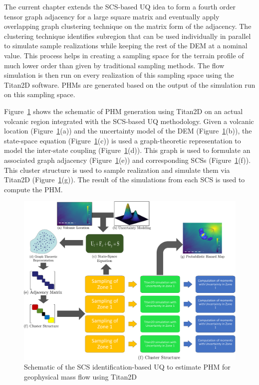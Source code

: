 

The current chapter extends the SCS-based UQ idea to form a fourth order tensor graph adjacency for a large square matrix and eventually apply overlapping graph clustering technique on the matrix form of the adjacency. The clustering technique identifies subregion that can be used individually in parallel to simulate sample realizations while keeping the rest of the DEM at a nominal value. This process helps in creating a sampling space for the terrain profile of much lower order than given by traditional sampling methods. The flow simulation is then run on every realization of this sampling space using the Titan2D software. PHMs are generated based on the output of the simulation run on this sampling space. 

Figure~\ref{fig:scs_titan} shows the schematic of PHM generation using Titan2D on an actual volcanic region integrated with the SCS-based UQ methodology. Given a volcanic location (Figure~\ref{fig:scs_titan}(a)) and the uncertainty model of the DEM (Figure~\ref{fig:scs_titan}(b)), the state-space equation (Figure~\ref{fig:scs_titan}(c)) is used a graph-theoretic representation to model the inter-state coupling (Figure~\ref{fig:scs_titan}(d)). This graph is used to formulate an associated graph adjacency (Figure~\ref{fig:scs_titan}(e)) and corresponding SCSs (Figure~\ref{fig:scs_titan}(f)). This cluster structure is used to sample realization and simulate them via Titan2D (Figure~\ref{fig:scs_titan}(g)). The result of the simulations from each SCS is used to compute the PHM. 

\begin{figure}[H]
\includegraphics[width=\textwidth]{dem_figs/dem_framework}
\caption{Schematic of the SCS identification-based UQ to estimate PHM for geophysical mass flow using Titan2D}
\label{fig:scs_titan}
\end{figure}

